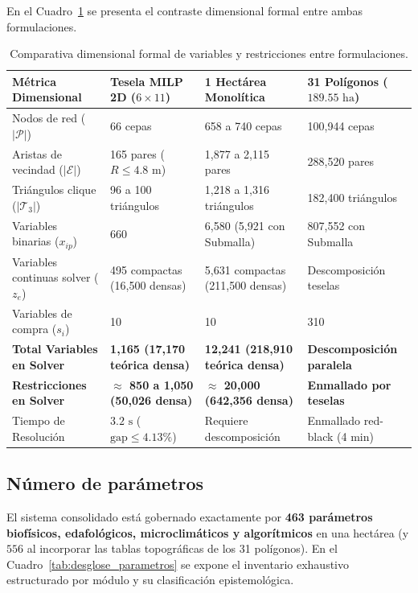 \documentclass[11pt,a4paper]{article}
\begin{document}
En el Cuadro~\ref{tab:comparativa_dimensional} se presenta el contraste dimensional formal entre ambas formulaciones.

\begin{table}[H]
\centering
\small
\caption{Comparativa dimensional formal de variables y restricciones entre formulaciones.}\label{tab:comparativa_dimensional}
\begin{tabularx}{\textwidth}{lXXX}
\toprule
\textbf{Métrica Dimensional} & \textbf{Tesela MILP 2D ($6\times 11$)} & \textbf{1 Hectárea Monolítica} & \textbf{31 Polígonos ($189.55\text{ ha}$)} \\
\midrule
Nodos de red ($|\mathcal{P}|$) & 66 cepas & 658 a 740 cepas & 100,944 cepas \\
Aristas de vecindad ($|\mathcal{E}|$) & 165 pares ($R \le 4.8\text{ m}$) & 1,877 a 2,115 pares & 288,520 pares \\
Triángulos clique ($|\mathcal{T}_3|$) & 96 a 100 triángulos & 1,218 a 1,316 triángulos & 182,400 triángulos \\
Variables binarias ($x_{ip}$) & 660 & 6,580 (5,921 con Submalla) & 807,552 con Submalla \\
Variables continuas solver ($z_e$) & 495 compactas (16,500 densas) & 5,631 compactas (211,500 densas) & Descomposición teselas \\
Variables de compra ($s_i$) & 10 & 10 & 310 \\
\textbf{Total Variables en Solver} & \textbf{1,165 (17,170 teórica densa)} & \textbf{12,241 (218,910 teórica densa)} & \textbf{Descomposición paralela} \\
\textbf{Restricciones en Solver} & \textbf{$\approx$ 850 a 1,050 (50,026 densa)} & \textbf{$\approx$ 20,000 (642,356 densa)} & \textbf{Enmallado por teselas} \\
Tiempo de Resolución & $3.2\text{ s}$ ($\text{gap} \le 4.13\%$) & Requiere descomposición & Enmallado red-black (4 min) \\
\bottomrule
\end{tabularx}
\end{table}

\subsection{Número de parámetros}
El sistema consolidado está gobernado exactamente por \textbf{463 parámetros biofísicos, edafológicos, microclimáticos y algorítmicos} en una hectárea (y $556$ al incorporar las tablas topográficas de los 31 polígonos). En el Cuadro~\ref{tab:desglose_parametros} se expone el inventario exhaustivo estructurado por módulo y su clasificación epistemológica.
\end{document}
